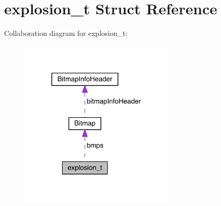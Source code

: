 \hypertarget{structexplosion__t}{}\section{explosion\+\_\+t Struct Reference}
\label{structexplosion__t}


Collaboration diagram for explosion\+\_\+t\+:\nopagebreak
\begin{figure}[H]
\begin{center}
\leavevmode
\includegraphics[width=211pt]{structexplosion__t__coll__graph}
\end{center}
\end{figure}
